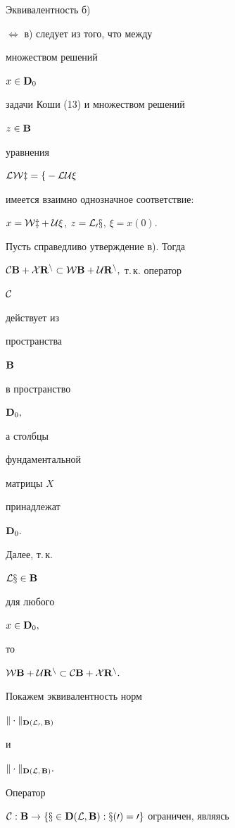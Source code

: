 \begin{pf} Эквивалентность б)


$\Leftrightarrow$ в) следует из того, что между


множеством решений


$x\in\bold D_0$


задачи Коши (13) и множеством решений


$z\in\bold B$


уравнения


$\cal L\cal W z = f - \cal L\cal U \xi$


имеется взаимно однозначное соответствие:


$x = \cal W z + \cal U \xi$, $z = \cal L_0x$, $\xi = x(0).$





Пусть справедливо утверждение в). Тогда


$\cal C\spc B + \cal X\spc R^n \subset \cal W\spc B +


\cal U\spc R^n,$ т.\,к. оператор


$\cal C$


действует из


пространства


$\bold B$


в пространство


$\bold D_0,$


а столбцы


фундаментальной


матрицы $X$


принадлежат


$\bold D_0.$


Далее, т.\,к.


$\cal Lx \in\bold B$


для любого


$x\in\bold D_0,$


то


$\cal W\bold B + \cal U\bold R^n \subset \cal C\bold B + \cal X\bold R^n.$





Покажем эквивалентность норм


$\|\cdot\|_{\bold D(\cal L_0,\,\bold B)}$


и


$\|\cdot\|_{\bold D(\cal L,\,\bold B)}.$


Оператор


$\cal C:\bold B\to\{x\in\bold D(\cal L,\bold B):x(0)=0\}$ ограничен, являясь



\end{pf}
